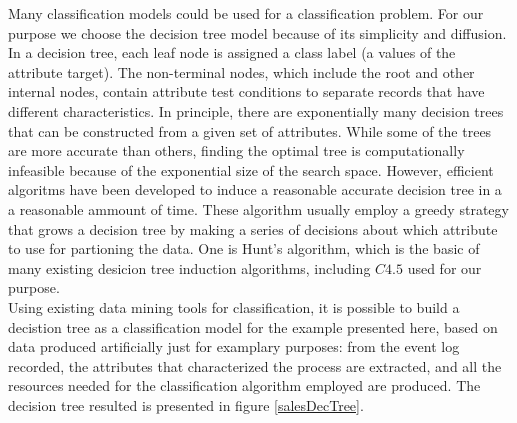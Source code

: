 \documentclass[11pt]{article}
\begin{document}
Many classification models could be used for a classification problem. For our purpose we choose the decision tree model because of its simplicity and diffusion. In a decision tree, each leaf node is assigned a class label (a values of the attribute target). The non-terminal nodes, which include the root and other internal nodes, contain attribute test conditions to separate records that have different characteristics. In principle, there are exponentially many decision trees that can be constructed from a given set of attributes. While some of the trees are more accurate than others, finding the optimal tree is computationally infeasible because of the exponential size of the search space.  However, efficient algoritms have been developed to induce a reasonable accurate decision tree in a a reasonable ammount of time. These algorithm usually employ a greedy strategy that grows a decision tree by making a series of decisions about which attribute to use for partioning the data. One is Hunt's algorithm, which is the basic of many existing desicion tree induction algorithms, including $C4.5$ used for our purpose.\\

Using existing data mining tools for classification, it is possible to build a decistion tree as a classification model for the example presented here, based on data produced artificially just for examplary purposes: from the event log recorded, the attributes that characterized the process are extracted, and all the resources needed for the classification algorithm employed are produced. The decision tree resulted is presented in figure \ref{salesDecTree}.\\
\end{document}
